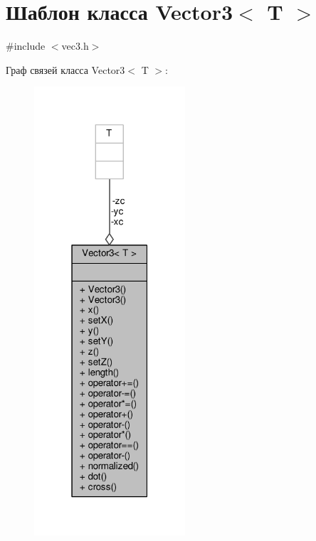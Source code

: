 \hypertarget{class_vector3}{}\section{Шаблон класса Vector3$<$ T $>$}
\label{class_vector3}


{\ttfamily \#include $<$vec3.\+h$>$}



Граф связей класса Vector3$<$ T $>$\+:
\nopagebreak
\begin{figure}[H]
\begin{center}
\leavevmode
\includegraphics[width=159pt]{db/d13/class_vector3__coll__graph}
\end{center}
\end{figure}
